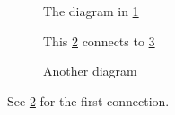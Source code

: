 \begin{figure}
\caption{The diagram in \ref{fig:self}}\label{fig:self}
\end{figure}
\begin{figure}
\caption{This \ref{fig:a} connects to \ref{fig:b}}\label{fig:a}
\end{figure}
\begin{figure}\caption{Another diagram}\label{fig:b}\end{figure}
See \ref{fig:a} for the first connection.
\nocite{*}
